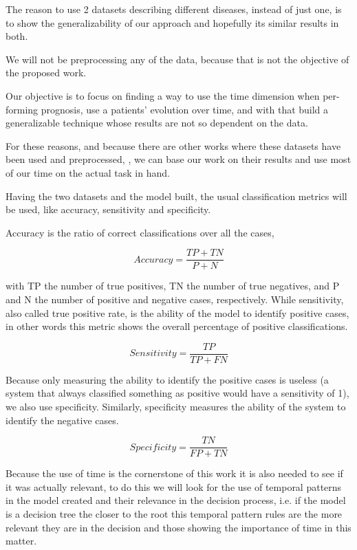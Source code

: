 The reason to use 2 datasets describing different diseases, instead of just one, is to show the generalizability of our approach and hopefully
its similar results in both.

We will not be preprocessing any of the data, because that is not the objective of the proposed work. 

Our objective is to focus on finding a way to use the time dimension when per-forming prognosis, use a patients’ evolution over time, and with
that build a generalizable technique whose results are not so dependent on the data.

For these reasons, and because there are other works where these datasets have been used and preprocessed, \cite{Delen2005} \cite{Choi2009}
\cite{Lakshmi2013} , we can base our work on their results and use most of our time on the actual task in hand. 

Having the two datasets and the model built, the usual classification metrics will be used, like accuracy, sensitivity and specificity.

Accuracy is the ratio of correct classifications over all the cases,

\begin{equation}
Accuracy=\frac{TP+TN}{P+N}
\label{eq:accuracy}
\end{equation} 

with TP the number of true positives, TN the number of true negatives, and P and N the number of positive and negative cases, respectively.
While sensitivity, also called true positive rate, is the ability of the model to identify positive cases, in other words this metric shows the overall percentage of positive classifications.


\begin{equation}
Sensitivity= \frac{ TP}{TP+FN}
\label{eq:sensitivity}
\end{equation} 

Because only measuring the ability to identify the positive cases is useless (a system that always classified something as positive would have a sensitivity of 1), we also use specificity. Similarly, specificity measures the ability of the system to identify the negative cases.

\begin{equation}
Specificity= \frac{ TN}{FP+TN}
\label{eq:specificity}
\end{equation} 

Because the use of time is the cornerstone of this work it is also needed to see if it was actually relevant, to do this we will look for the use of temporal patterns in the model created and their relevance in the decision process, i.e. if the model is a decision tree the closer to the root this temporal pattern rules are the more relevant they are in the decision and those showing the importance of time in this matter.



